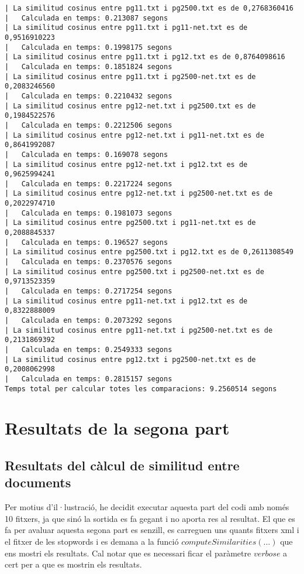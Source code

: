 \documentclass{report}
\begin{document}
\begin{verbatim}
| La similitud cosinus entre pg11.txt i pg2500.txt es de 0,2768360416
|	Calculada en temps: 0.213087 segons
| La similitud cosinus entre pg11.txt i pg11-net.txt es de 0,9516910223
|	Calculada en temps: 0.1998175 segons
| La similitud cosinus entre pg11.txt i pg12.txt es de 0,8764098616
|	Calculada en temps: 0.1851824 segons
| La similitud cosinus entre pg11.txt i pg2500-net.txt es de 0,2083246560
|	Calculada en temps: 0.2210432 segons
| La similitud cosinus entre pg12-net.txt i pg2500.txt es de 0,1984522576
|	Calculada en temps: 0.2212506 segons
| La similitud cosinus entre pg12-net.txt i pg11-net.txt es de 0,8641992087
|	Calculada en temps: 0.169078 segons
| La similitud cosinus entre pg12-net.txt i pg12.txt es de 0,9625994241
|	Calculada en temps: 0.2217224 segons
| La similitud cosinus entre pg12-net.txt i pg2500-net.txt es de 0,2022974710
|	Calculada en temps: 0.1981073 segons
| La similitud cosinus entre pg2500.txt i pg11-net.txt es de 0,2088845337
|	Calculada en temps: 0.196527 segons
| La similitud cosinus entre pg2500.txt i pg12.txt es de 0,2611308549
|	Calculada en temps: 0.2370576 segons
| La similitud cosinus entre pg2500.txt i pg2500-net.txt es de 0,9713523359
|	Calculada en temps: 0.2717254 segons
| La similitud cosinus entre pg11-net.txt i pg12.txt es de 0,8322888009
|	Calculada en temps: 0.2073292 segons
| La similitud cosinus entre pg11-net.txt i pg2500-net.txt es de 0,2131869392
|	Calculada en temps: 0.2549333 segons
| La similitud cosinus entre pg12.txt i pg2500-net.txt es de 0,2008062998
|	Calculada en temps: 0.2815157 segons
Temps total per calcular totes les comparacions: 9.2560514 segons

\end{verbatim}

\newpage

\section{Resultats de la segona part}

\subsection{Resultats del càlcul de similitud entre documents}

Per motius d'il·lustració, he decidit executar aquesta part del codi amb només 10 fitxers, ja que sinó la sortida es fa gegant i no aporta res al resultat. El que es fa per avaluar aquesta segona part es senzill, es carreguen uns quants fitxers xml i el fitxer de les stopwords i es demana a la funció $computeSimilarities(...)$ que ens mostri els resultats. Cal notar que es necessari ficar el paràmetre $verbose$ a cert per a que es mostrin els resultats.
\end{document}

